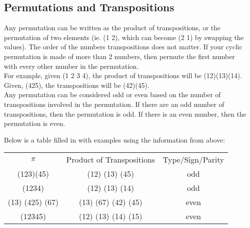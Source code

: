 \label{40-0516}
\subsection{Permutations and Transpositions}

Any permutation can be written as the product of transpositions, 
or the permutation of two elements (ie. (1 2), which can become (2 1) by swapping
the values). The order of the numbers transpositions does not matter. If your cyclic
permutation is made of more than 2 numbers, then permute the ﬁrst number
 with every other number in the permutation. \\

For example, given (1 2 3 4), the product of transpositions will be (12)(13)(14).
Given, (425), the transpositions will be (42)(45).\\

Any permutation can be considered odd or even based on the number of
transpositions involved in the permutation. If there are an odd number of
transpositions, then the permutation is odd. If there is an even number,
then the permutation is even.

Below is a table ﬁlled in with examples using the information from
above:
\begin{center}
    \begin{tabular}{ccc}
        $\pi$ & Product of Transpositions & Type/Sign/Parity\\
        (123)(45) & (12) (13) (45)  & odd\\
(1234) & (12) (13) (14) & odd\\
(13) (425) (67)&  (13) (67) (42) (45) & even\\
(12345) & (12) (13) (14) (15)&  even
    \end{tabular}
\end{center}

